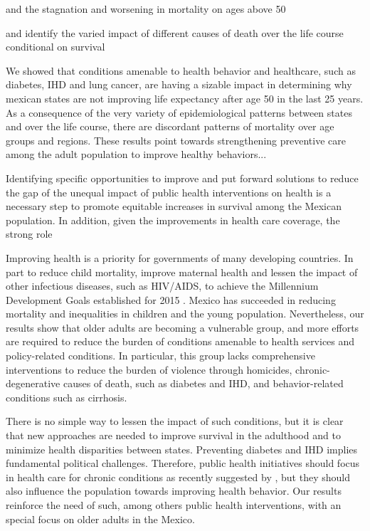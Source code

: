 \documentclass{bmcart}
\begin{document}
and the stagnation and worsening in mortality on ages above 50

 and identify the varied impact of different causes of death over the life course conditional on survival 

We showed that conditions amenable to health behavior and healthcare, such as diabetes, IHD and lung cancer, are having a sizable impact in determining why mexican states are not improving life expectancy after age 50 in the last 25 years. As a consequence of the very variety of epidemiological patterns between states and over the life course, there are discordant patterns of mortality over age groups and regions. These results point towards strengthening preventive care among the adult population to improve healthy behaviors...

Identifying specific opportunities to improve and put forward solutions to reduce the gap of  the unequal impact of public health interventions on health is a necessary step to promote equitable increases in survival among the Mexican population.%
 In addition,  given the improvements in health care coverage, the strong role %
 
Improving health is a priority for governments of many developing countries. In part to reduce child mortality, improve maternal health and lessen the impact of other infectious diseases, such as HIV/AIDS, to achieve the Millennium Development Goals established for 2015 \cite{united2009millennium}.  Mexico has succeeded in reducing mortality and inequalities in children and the young population. Nevertheless, our results show that older adults are becoming a vulnerable group, and more efforts are required to reduce the burden of conditions amenable to health services and policy-related conditions. In particular, this group lacks comprehensive interventions to reduce the burden of violence through homicides, chronic-degenerative causes of death, such as diabetes and IHD, and behavior-related conditions such as cirrhosis.  

There is no simple way to lessen the impact of such conditions, but it is clear that new approaches are needed to improve survival in the adulthood and to minimize health disparities between states. Preventing diabetes and IHD implies fundamental political challenges. Therefore,  public health initiatives should focus in health care for chronic conditions as recently suggested by \cite{knaul2015achieving}, but they should also influence the population towards improving health behavior. Our results reinforce the need of such, among others public health interventions, with an special focus on older adults in the Mexico. 
\end{document}
